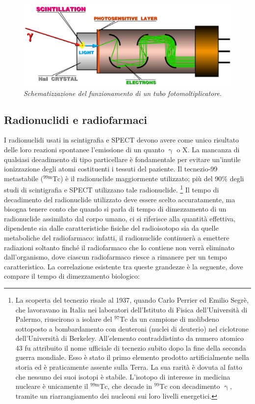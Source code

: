\documentclass{report}
\numberwithin{equation}{section}
\numberwithin{figure}{section}
\begin{document}
\begin{figure}[htp]
    \centering
    \includegraphics[scale=0.6]{immagini/pmt.png}
    \caption{\label{fig:pmt} \textit{Schematizzazione del funzionamento di un tubo fotomoltiplicatore}.}
\end{figure}

\subsection{Radionuclidi e radiofarmaci}
I radionuclidi usati in scintigrafia e SPECT devono avere come unico risultato delle loro reazioni spontanee l'emissione di un quanto $\upgamma$ o X. La mancanza di qualsiasi decadimento di tipo particellare è fondamentale per evitare un'inutile ionizzazione degli atomi costituenti i tessuti del paziente. Il tecnezio-99 metastabile ($\mathrm{^{99m}Tc}$) è il radionuclide maggiormente utilizzato; più del 90\% degli studi di scintigrafia e SPECT utilizzano tale radionuclide.%
\footnote{La scoperta del tecnezio risale al 1937, quando Carlo Perrier ed Emilio Segrè, che lavoravano in Italia nei laboratori dell'Istituto di Fisica dell'Università di Palermo, riuscirono a isolare del $\mathrm{^{97}Tc}$ da un campione di molibdeno sottoposto a bombardamento con deuteroni (nuclei di deuterio) nel ciclotrone dell'Università di Berkeley. All'elemento contraddistinto da numero atomico 43 fu attribuito il nome ufficiale di tecnezio subito dopo la fine della seconda guerra mondiale. Esso è stato il primo elemento prodotto artificialmente nella storia ed è praticamente assente sulla Terra. La sua rarità è dovuta al fatto che nessuno dei suoi isotopi è stabile. L'isotopo di interesse in medicina nucleare è unicamente il $\mathrm{^{99m}Tc}$, che decade in $\mathrm{^{99}Tc}$ con decadimento $\upgamma$, tramite un riarrangiamento dei nucleoni sui loro livelli energetici.}
Il tempo di decadimento del radionuclide utilizzato deve essere scelto accuratamente, ma bisogna tenere conto che quando si parla di tempo di dimezzamento di un radionuclide assimilato dal corpo umano, ci si riferisce alla quantità effettiva, dipendente sia dalle caratteristiche fisiche del radioisotopo sia da quelle metaboliche del radiofarmaco: infatti, il radionuclide continuerà a emettere radiazioni soltanto finché il radiofarmaco che lo contiene non verrà eliminato dall'organismo, dove ciascun radiofarmaco riesce a rimanere per un tempo caratteristico. La correlazione esistente tra queste grandezze è la seguente, dove compare il tempo di dimezzamento biologico:
\end{document}
